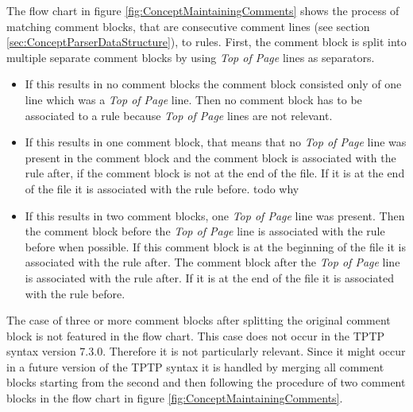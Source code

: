 The flow chart in figure \ref{fig:ConceptMaintainingComments} shows the process of matching comment blocks, that are consecutive comment lines (see section \ref{sec:ConceptParserDataStructure}),  to rules.
First, the comment block is split into multiple separate comment blocks by using \textit{Top of Page} lines as separators.
\begin{itemize}%
	\item If this results in no comment blocks the comment block consisted only of one line which was a \textit{Top of Page} line.
	Then no comment block has to be associated to a rule because \textit{Top of Page} lines are not relevant.
	\item If this results in one comment block, that means that no \textit{Top of Page} line was present in the comment block and the comment block is associated with the rule after, if the comment block is not at the end of the file.
	If it is at the end of the file it is associated with the rule before. todo why
	\item If this results in two comment blocks, one \textit{Top of Page} line was present.
	Then the comment block before the \textit{Top of Page} line is associated with the rule before when possible.
	If this comment block is at the beginning of the file it is associated with the rule after.
	The comment block after the \textit{Top of Page} line is associated with the rule after.
	If it is at the end of the file it is associated with the rule before.
\end{itemize}
The case of three or more comment blocks after splitting the original comment block is not featured in the flow chart.
This case does not occur in the \ac{TPTP} syntax version 7.3.0.
Therefore it is not particularly relevant.
Since it might occur in a future version of the \ac{TPTP} syntax it is handled by merging all comment blocks starting from the second and then following the procedure of two comment blocks in the flow chart in figure \ref{fig:ConceptMaintainingComments}.


